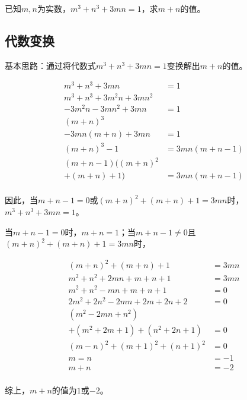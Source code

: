 

已知$m, n$为实数，$m^3 + n^3 + 3mn = 1$，求$m + n$的值。


\subsection{代数变换}

基本思路：通过将代数式$m^3 + n^3 + 3mn = 1$变换解出$m + n$的值。

\begin{align*}
  m^3 + n^3 + 3mn &= 1 \\
  m^3 + n^3 + 3m^2n + 3mn^2 &\\ - 3m^2n - 3mn^2 + 3mn &= 1 \\
  (m + n)^3 &\\ - 3mn(m + n) + 3mn &= 1 \\
  (m + n)^3 - 1 &= 3mn(m + n - 1) \\
  (m + n - 1)((m + n)^2 &\\ + (m + n) + 1) &= 3mn(m + n - 1) \\
\end{align*}

因此，当$m + n - 1 = 0$或$(m + n)^2 + (m + n) + 1 = 3mn$时，$m^3 + n^3 + 3mn = 1$。

当$m + n - 1 = 0$时，$m + n = 1$；当$m + n - 1 \ne 0$且$(m + n)^2 + (m + n) + 1 = 3mn$时，

\begin{align*}
  (m + n)^2 + (m + n) + 1 &= 3mn \\
  m^2 + n^2 + 2mn + m + n + 1 &= 3mn \\
  m^2 + n^2 - mn + m + n + 1 &= 0 \\
  2m^2 + 2n^2 - 2mn + 2m + 2n + 2 &= 0 \\
  (m^2 - 2mn + n^2) &\\ + (m^2 + 2m + 1) + (n^2 + 2n + 1) &= 0 \\
  (m - n)^2 + (m + 1)^2 + (n + 1)^2 &= 0 \\
  m = n &= -1 \\
  m + n &= -2 \\
\end{align*}

综上，$m + n$的值为$1$或$-2$。
